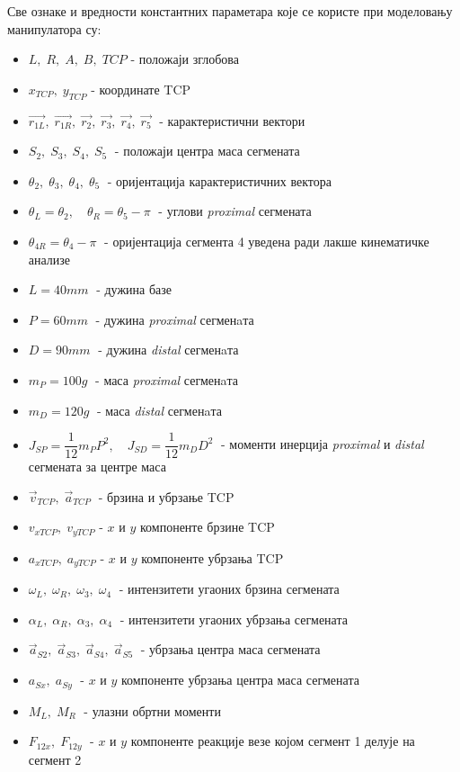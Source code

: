 \documentclass[12pt]{article}
\begin{document}
Све ознаке и вредности константних параметара које се користе при моделовању манипулатора су:
\begin{itemize}
    \item $L,\; R,\; A,\; B,\; TCP$ - положаји зглобова
    \item $x_{TCP},\;y_{TCP}$ - координате TCP
    \item $\vec{r_{1L}},\; \vec{r_{1R}},\; \vec{r_{2}},\; \vec{r_{3}},\; \vec{r_{4}}, \;\vec{r_{5}}\;$ - карактеристични вектори
    \item $S_2,\; S_3,\; S_4,\; S_5\;$ - положаји центра маса сегмената
    \item $\theta_2,\; \theta_3,\; \theta_4,\; \theta_5\;$ - оријентација карактеристичних вектора
    \item $\theta_L = \theta_2, \quad \theta_R = \theta_5-\pi\;$ - углови \textit{proximal} сегмената
    \item $\theta_{4R} = \theta_4-\pi\;$ - оријентација сегмента 4 уведена ради лакше кинематичке анализе
    \item $L = 40mm\;$ - дужина базе
    \item $P = 60mm\;$ - дужина \textit{proximal} сегменaта
    \item $D = 90mm\;$ - дужина \textit{distal} сегменaта
    \item $m_P = 100g\;$ - маса \textit{proximal} сегменaта
    \item $m_D = 120g\;$ - маса \textit{distal} сегменaта
    \item $J_{SP} = \dfrac{1}{12} m_P P ^ 2,\quad J_{SD} = \dfrac{1}{12} m_D D ^ 2\;$ - моменти инерција \textit{proximal} и \textit{distal} сегмената за центре маса
    \item $\vec{v}_{TCP},\; \vec{a}_{TCP}\;$ - брзина и убрзање TCP
    \item $v_{xTCP},\;v_{yTCP}$ - $x$ и $y$ компоненте брзине  TCP
    \item $a_{xTCP},\;a_{yTCP}$ - $x$ и $y$ компоненте убрзања TCP
    \item $\omega_L,\; \omega_R,\; \omega_3,\; \omega_4\;$ - интензитети угаоних брзина сегмената
    \item $\alpha_L,\; \alpha_R,\; \alpha_3,\; \alpha_4\;$ - интензитети угаоних убрзања сегмената
    \item $\vec{a}_{S2},\; \vec{a}_{S3},\; \vec{a}_{S4},\; \vec{a}_{S5}\;$ - убрзања центра маса сегмената
    \item $a_{Sx},\; a_{Sy}\;$ - $x$ и $y$ компоненте убрзања центра маса сегмената
    \item $M_L,\;M_R\;$ - улазни обртни моменти
    \item $F_{12x},\; F_{12y}\;$ - $x$ и $y$ компоненте реакције везе којом сегмент 1 делује на сегмент 2
\end{itemize}
\end{document}
